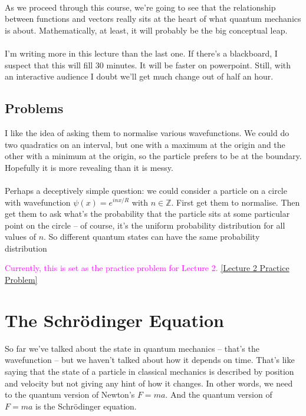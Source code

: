 \documentclass[12pt]{article}
\newcommand\para{\paragraph{}}
\newcommand{\Z}{{\mathds Z}}
\newcommand{\alyssa}{\textcolor{magenta}}
\begin{document}
\para
As we proceed through this course, we're going to see that the relationship between functions and vectors really sits at the heart of what quantum mechanics is about. Mathematically, at least, it will probably be the big conceptual leap. 

\para
{\color{red} I'm writing more in this lecture than the last one. If there's a blackboard, I suspect that this will fill 30 minutes. It will be faster on powerpoint. Still, with an interactive audience I doubt we'll get much change out of half an hour.}


{\color{blue}\subsection{Problems} I like the idea of asking them to normalise various wavefunctions. We could do two quadratics on an interval, but one with a maximum at the origin and the other with a minimum at the origin, so the particle prefers to be at the boundary. Hopefully it is more revealing than it is messy.

\para
Perhaps a deceptively simple question: we could consider a particle on a circle with wavefunction $\psi(x) = e^{i nx/R }$ with $n\in \Z$. First get them to normalise. Then get them to ask what's the probability that the particle sits at some particular point on the circle -- of course, it's the uniform probability distribution for all values of $n$. So different quantum states can have the same probability distribution} \alyssa{Currently, this is set as the practice problem for Lecture 2.} \href{https://drive.google.com/file/d/1Q7qUD2UxkJ8PmS6yvz7MZLnbiHyQ6ZD6/view?usp=drive_link}{[Lecture 2 Practice Problem]}

\newpage
\section{The Schr\"{o}dinger Equation}

So far we've talked about the state in quantum mechanics -- that's the wavefunction -- but we haven't talked about how it depends on time. That's like saying that the state of a particle in classical mechanics is described by position and velocity but not giving any hint of how it changes. In other words, we need to the quantum version of Newton's $F=ma$. And the quantum version of $F=ma$ is the Schr\"{o}dinger equation. 
\end{document}

